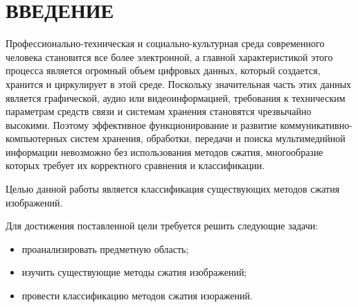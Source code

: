 \chapter*{ВВЕДЕНИЕ}

    
   Профессионально-техническая и социально-культурная среда современного человека становится все более электронной, а главной характеристикой этого процесса является огромный объем цифровых данных, который создается, хранится и циркулирует в этой среде. Поскольку значительная часть этих данных является графической, аудио или видеоинформацией, требования к техническим параметрам средств связи и системам хранения становятся чрезвычайно высокими. Поэтому эффективное функционирование и развитие коммуникативно-компьютерных систем хранения, обработки, передачи и поиска мультимедийной информации невозможно без использования методов сжатия, многообразие которых требует их корректного сравнения и классификации.
    
    
    Целью данной работы является классификация существующих методов сжатия изображений.
    
    Для достижения поставленной цели требуется решить следующие задачи:
    
    \begin{itemize}
    	\item проанализировать предметную область;
    	\item изучить существующие методы сжатия изображений;
    	\item провести классификацию методов сжатия изоражений.
    \end{itemize}